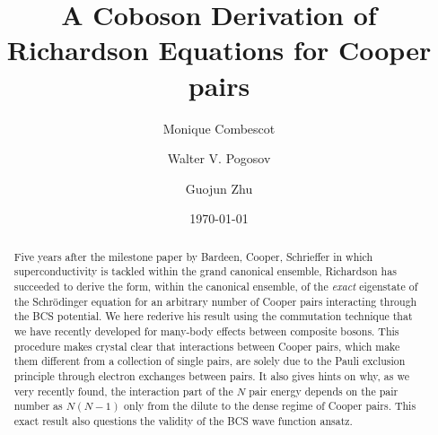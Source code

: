 \documentclass[aps,prb,amsmath,amssymb,preprint,superscriptaddress]{revtex4-1}
\begin{document}

\title{A Coboson Derivation of Richardson Equations for Cooper pairs}


\author{Monique Combescot}
\author{Walter V. Pogosov}
\author{Guojun Zhu}



\date{\today}

\begin{abstract}
Five years after the milestone paper by Bardeen, Cooper, Schrieffer in which superconductivity is tackled within the grand canonical ensemble, Richardson has succeeded to derive the form, within the canonical ensemble, of the \textit{exact} eigenstate of the Schr\"{o}dinger equation for an arbitrary number of Cooper pairs interacting through the BCS potential.  We here rederive his result using the commutation technique that we have recently developed for many-body effects between composite bosons.  This procedure makes crystal clear that interactions between Cooper pairs, which make them different from a collection of single pairs, are solely due to the Pauli exclusion principle through electron exchanges between pairs. It also gives hints on why, as we very recently found, the interaction part of the $N$ pair energy depends on the pair number as $N(N-1)$ only from the dilute to the dense regime of Cooper pairs. This  exact result also questions the validity of the BCS wave function ansatz. 
\end{abstract}
\end{document}
